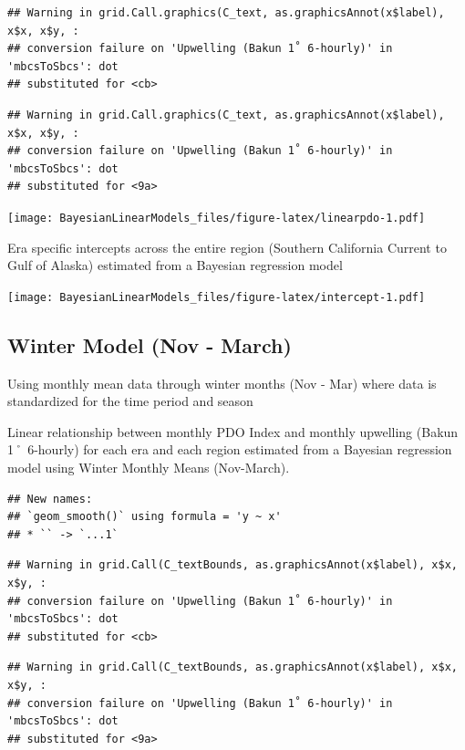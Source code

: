 \documentclass[
]{article}
\begin{document}
\begin{verbatim}
## Warning in grid.Call.graphics(C_text, as.graphicsAnnot(x$label), x$x, x$y, :
## conversion failure on 'Upwelling (Bakun 1˚ 6-hourly)' in 'mbcsToSbcs': dot
## substituted for <cb>
\end{verbatim}

\begin{verbatim}
## Warning in grid.Call.graphics(C_text, as.graphicsAnnot(x$label), x$x, x$y, :
## conversion failure on 'Upwelling (Bakun 1˚ 6-hourly)' in 'mbcsToSbcs': dot
## substituted for <9a>
\end{verbatim}

\texttt{[image: BayesianLinearModels\_files/figure-latex/linearpdo-1.pdf]}

Era specific intercepts across the entire region (Southern California
Current to Gulf of Alaska) estimated from a Bayesian regression model

\texttt{[image: BayesianLinearModels\_files/figure-latex/intercept-1.pdf]}

\hypertarget{winter-model-nov---march}{%
\subsection{Winter Model (Nov - March)}\label{winter-model-nov---march}}

Using monthly mean data through winter months (Nov - Mar) where data is
standardized for the time period and season

Linear relationship between monthly PDO Index and monthly upwelling
(Bakun 1˚ 6-hourly) for each era and each region estimated from a
Bayesian regression model using Winter Monthly Means (Nov-March).

\begin{verbatim}
## New names:
## `geom_smooth()` using formula = 'y ~ x'
## * `` -> `...1`
\end{verbatim}

\begin{verbatim}
## Warning in grid.Call(C_textBounds, as.graphicsAnnot(x$label), x$x, x$y, :
## conversion failure on 'Upwelling (Bakun 1˚ 6-hourly)' in 'mbcsToSbcs': dot
## substituted for <cb>
\end{verbatim}

\begin{verbatim}
## Warning in grid.Call(C_textBounds, as.graphicsAnnot(x$label), x$x, x$y, :
## conversion failure on 'Upwelling (Bakun 1˚ 6-hourly)' in 'mbcsToSbcs': dot
## substituted for <9a>
\end{verbatim}
\end{document}
